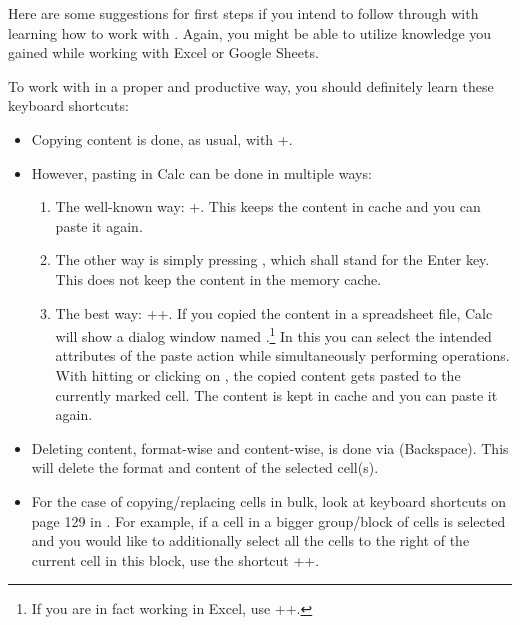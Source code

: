 Here are some suggestions for first steps if you intend to follow through with learning how to work with \loc.
Again, you might be able to utilize knowledge you gained while working with Excel or Google Sheets.

To work with \tfn in a proper and productive way, you should definitely learn these keyboard shortcuts:
\begin{itemize}
	\item Copying content is done, as usual, with +.
	\item However, pasting in Calc can be done in multiple ways:
	\begin{enumerate}
		\item The well-known way: +.
		This keeps the content in cache and you can paste it again.
		\item The other way is simply pressing \keystroke{\( \hookleftarrow \)}, which shall stand for the Enter key.
		This does not keep the content in the memory cache.
		\item The best way: ++.
		If you copied the content in a spreadsheet file, Calc will show a dialog window named .\footnote{If you are in fact working in Excel, use ++.}
		In this you can select the intended attributes of the paste action while simultaneously performing operations.
		With hitting \keystroke{\( \hookleftarrow \)} or clicking on , the copied content gets pasted to the currently marked cell.
		The content is kept in cache and you can paste it again.
	\end{enumerate}
	\item Deleting content, format-wise and content-wise, is done via \keystroke{\( \longleftarrow \)} (Backspace).
	This will delete the format and content of the selected cell(s).
	\item For the case of copying/replacing cells in bulk, look at keyboard shortcuts on page 129 in .
	For example, if a cell in a bigger group/block of cells is selected and you would like to additionally select all the cells to the right of the current cell in this block, use the shortcut ++\keystroke{\( \rightarrow \)}.
\end{itemize}

